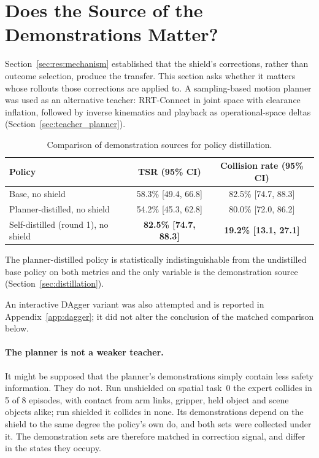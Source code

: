 \documentclass[a4paper,11pt]{report}
\begin{document}
\section{Does the Source of the Demonstrations Matter?}\label{sec:res:source}

Section~\ref{sec:res:mechanism} established that the shield's corrections, rather than outcome
selection, produce the transfer. This section asks whether it matters whose rollouts those
corrections are applied to. A sampling-based motion planner was used as an alternative teacher:
RRT-Connect in joint space with clearance inflation, followed by inverse kinematics and playback as
operational-space deltas (Section~\ref{sec:teacher_planner}).

\begin{table}[htbp]
\centering
\caption{Comparison of demonstration sources for policy distillation.}
\label{tab:demo_source_comparison}
\begin{tabular}{lcc}
\toprule
\textbf{Policy} & \textbf{TSR (95\% CI)} & \textbf{Collision rate (95\% CI)} \\
\midrule
Base, no shield                     & 58.3\% [49.4, 66.8] & 82.5\% [74.7, 88.3] \\
Planner-distilled, no shield        & 54.2\% [45.3, 62.8] & 80.0\% [72.0, 86.2] \\
Self-distilled (round 1), no shield & \textbf{82.5\% [74.7, 88.3]} & \textbf{19.2\% [13.1, 27.1]} \\
\bottomrule
\end{tabular}
\end{table}

The planner-distilled policy is statistically indistinguishable from the undistilled base policy on
both metrics and the only variable is the demonstration source (Section~\ref{sec:distillation}).

An interactive DAgger variant was also attempted and is reported in Appendix~\ref{app:dagger}; it did not alter the conclusion of the matched comparison below.

\paragraph{The planner is not a weaker teacher.}
It might be supposed that the planner's demonstrations simply contain less safety information.
They do not. Run unshielded on spatial task~0 the expert collides in 5 of 8 episodes, with
contact from arm links, gripper, held object and scene objects alike; run shielded it collides
in none. Its demonstrations depend on the shield to the same degree the policy's own do, and
both sets were collected under it. The demonstration sets are therefore matched in correction
signal, and differ in the states they occupy.
\end{document}
